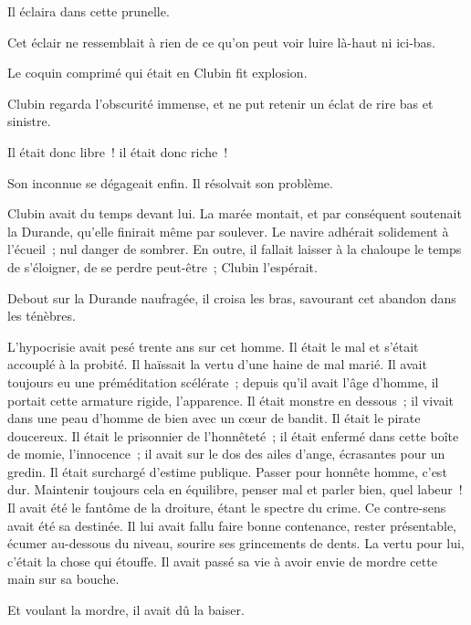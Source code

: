 \documentclass[french,twoside]{book} %
\begin{document}
Il éclaira dans cette prunelle.\par
Cet éclair ne ressemblait à rien de ce qu’on peut voir luire là-haut ni ici-bas.\par
Le coquin comprimé qui était en Clubin fit explosion.\par
Clubin regarda l’obscurité immense, et ne put retenir un éclat de rire bas et sinistre.\par
Il était donc libre ! il était donc riche !\par
Son inconnue se dégageait enfin. Il résolvait son problème.\par
Clubin avait du temps devant lui. La marée montait, et par conséquent soutenait la Durande, qu’elle finirait même par soulever. Le navire adhérait solidement à l’écueil ; nul danger de sombrer. En outre, il fallait laisser à la chaloupe le temps de s’éloigner, de se perdre peut-être ; Clubin l’espérait.\par
Debout sur la Durande naufragée, il croisa les bras, savourant cet abandon dans les ténèbres.\par
L’hypocrisie avait pesé trente ans sur cet homme. Il était le mal et s’était accouplé à la probité. Il haïssait la vertu d’une haine de mal marié. Il avait toujours eu une préméditation scélérate ; depuis qu’il avait l’âge d’homme, il portait cette armature rigide, l’apparence. Il était monstre en dessous ; il vivait dans une peau d’homme de bien avec un cœur de bandit. Il était le pirate doucereux. Il était le prisonnier de l’honnêteté ; il était enfermé dans cette boîte de momie, l’innocence ;  il avait sur le dos des ailes d’ange, écrasantes pour un gredin. Il était surchargé d’estime publique. Passer pour honnête homme, c’est dur. Maintenir toujours cela en équilibre, penser mal et parler bien, quel labeur ! Il avait été le fantôme de la droiture, étant le spectre du crime. Ce contre-sens avait été sa destinée. Il lui avait fallu faire bonne contenance, rester présentable, écumer au-dessous du niveau, sourire ses grincements de dents. La vertu pour lui, c’était la chose qui étouffe. Il avait passé sa vie à avoir envie de mordre cette main sur sa bouche.\par
Et voulant la mordre, il avait dû la baiser.\par
\end{document}
